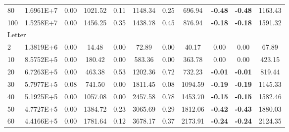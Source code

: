 {\begin{longtable}{@{}llccccccccc@{}}
\multicolumn{1}{l|}{80}  & \multicolumn{1}{l|}{1.6961E+7}  & 0.00 & \multicolumn{1}{c|}{1021.52} & 0.11 & \multicolumn{1}{c|}{1148.34} & 0.25 & \multicolumn{1}{c|}{696.94}  & \textbf{-0.48} & \textbf{-0.48} & 1163.43 \\
\multicolumn{1}{l|}{100} & \multicolumn{1}{l|}{1.5258E+7}  & 0.00 & \multicolumn{1}{c|}{1456.25} & 0.35 & \multicolumn{1}{c|}{1438.78} & 0.45 & \multicolumn{1}{c|}{876.94}  & \textbf{-0.18} & \textbf{-0.18} & 1591.32 \\ \hline
\multicolumn{11}{l}{Letter}                                                                                                                                                                                              \\ \hline
\multicolumn{1}{l|}{2}   & \multicolumn{1}{l|}{1.3819E+6}  & 0.00 & \multicolumn{1}{c|}{14.48}   & 0.00 & \multicolumn{1}{c|}{72.89}   & 0.00 & \multicolumn{1}{c|}{40.17}   & 0.00           & 0.00           & 67.89   \\
\multicolumn{1}{l|}{10}  & \multicolumn{1}{l|}{8.5752E+5}  & 0.00 & \multicolumn{1}{c|}{180.42}  & 0.00 & \multicolumn{1}{c|}{583.36}  & 0.00 & \multicolumn{1}{c|}{363.78}  & 0.00           & 0.00           & 423.15  \\
\multicolumn{1}{l|}{20}  & \multicolumn{1}{l|}{6.7263E+5}  & 0.00 & \multicolumn{1}{c|}{463.38}  & 0.53 & \multicolumn{1}{c|}{1202.36} & 0.72 & \multicolumn{1}{c|}{732.23}  & \textbf{-0.01} & \textbf{-0.01} & 819.44  \\
\multicolumn{1}{l|}{30}  & \multicolumn{1}{l|}{5.7977E+5}  & 0.08 & \multicolumn{1}{c|}{741.50}  & 0.00 & \multicolumn{1}{c|}{1811.45} & 0.08 & \multicolumn{1}{c|}{1094.59} & \textbf{-0.19} & \textbf{-0.19} & 1145.33 \\
\multicolumn{1}{l|}{40}  & \multicolumn{1}{l|}{5.1925E+5}  & 0.00 & \multicolumn{1}{c|}{1057.08} & 0.00 & \multicolumn{1}{c|}{2457.58} & 0.78 & \multicolumn{1}{c|}{1453.70} & \textbf{-0.15} & \textbf{-0.15} & 1582.46 \\
\multicolumn{1}{l|}{50}  & \multicolumn{1}{l|}{4.7727E+5}  & 0.00 & \multicolumn{1}{c|}{1384.72} & 0.23 & \multicolumn{1}{c|}{3065.69} & 0.29 & \multicolumn{1}{c|}{1812.06} & \textbf{-0.42} & \textbf{-0.43} & 1880.03 \\
\multicolumn{1}{l|}{60}  & \multicolumn{1}{l|}{4.4166E+5}  & 0.00 & \multicolumn{1}{c|}{1781.64} & 0.12 & \multicolumn{1}{c|}{3678.17} & 0.37 & \multicolumn{1}{c|}{2173.91} & \textbf{-0.24} & \textbf{-0.24} & 2124.35 \\

\end{longtable}}
